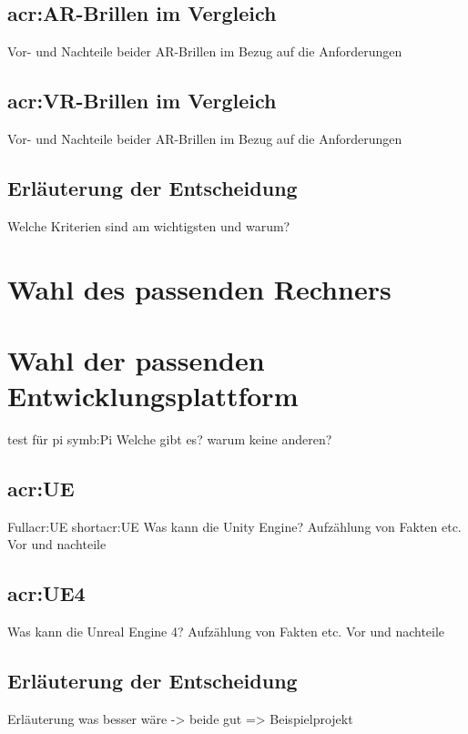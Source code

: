 \subsection{\acrshort{acr:AR}-Brillen im Vergleich}
\label{ARVergleich}
Vor- und Nachteile beider AR-Brillen im Bezug auf die Anforderungen

\subsection{\acrshort{acr:VR}-Brillen im Vergleich}
Vor- und Nachteile beider AR-Brillen im Bezug auf die Anforderungen

\subsection{Erläuterung der Entscheidung}
Welche Kriterien sind am wichtigsten und warum?

\section{Wahl des passenden Rechners}

\section{Wahl der passenden Entwicklungsplattform}
test für pi \gls{symb:Pi}
Welche gibt es? warum keine anderen?
\subsection{\acrlong{acr:UE}}
Full\acrfull{acr:UE}   short\acrshort{acr:UE}
Was kann die Unity Engine? Aufzählung von Fakten etc.
Vor und nachteile
\subsection{\acrlong{acr:UE4}}
Was kann die Unreal Engine 4? Aufzählung von Fakten etc.
Vor und nachteile

\subsection{Erläuterung der Entscheidung}
Erläuterung was besser wäre -> beide gut
=> Beispielprojekt










